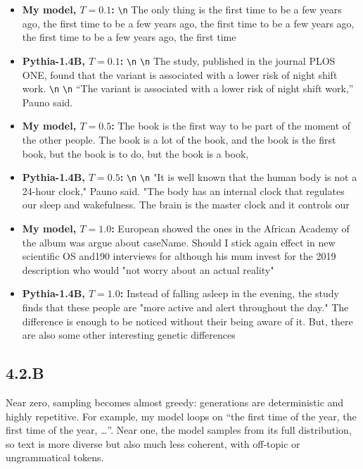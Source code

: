 \documentclass{article}
\begin{document}
\begin{itemize}
  \item \textbf{My model, $T=0.1$:}  \texttt{\textbackslash n} The only thing is the first time to be a few years ago, the first time to be a few years ago, the first time to be a few years ago, the first time to be a few years ago, the first time
  \item \textbf{Pythia-1.4B, $T=0.1$:}  \texttt{\textbackslash n}  \texttt{\textbackslash n} The study, published in the journal PLOS ONE, found that the variant is associated with a lower risk of night shift work. \texttt{\textbackslash n}  \texttt{\textbackslash n} ``The variant is associated with a lower risk of night shift work,'' Pauno said.
  \item \textbf{My model, $T=0.5$:}  The book is the first way to be part of the moment of the other people. The book is a lot of the book, and the book is the first book, but the book is to do, but the book is a book,
  \item \textbf{Pythia-1.4B, $T=0.5$:}  \texttt{\textbackslash n}  \texttt{\textbackslash n} "It is well known that the human body is not a 24-hour clock," Pauno said. "The body has an internal clock that regulates our sleep and wakefulness. The brain is the master clock and it controls our
  \item \textbf{My model, $T=1.0$:}  European showed the ones in the African Academy of the album was argue about caseName. Should I stick again effect in new scientific OS and190 interviews for although his mum invest for the 2019 description who would "not worry about an actual reality"
  \item \textbf{Pythia-1.4B, $T=1.0$:}  Instead of falling asleep in the evening, the study finds that these people are "more active and alert throughout the day." The difference is enough to be noticed without their being aware of it. But, there are also some other interesting genetic differences
\end{itemize}


\subsection*{4.2.B}
Near zero, sampling becomes almost greedy: generations are deterministic and highly repetitive. For example, my model loops on ``the first time of the year, the first time of the year, \ldots''. Near one, the model samples from its full distribution, so text is more diverse but also much less coherent, with off-topic or ungrammatical tokens.
\end{document}
